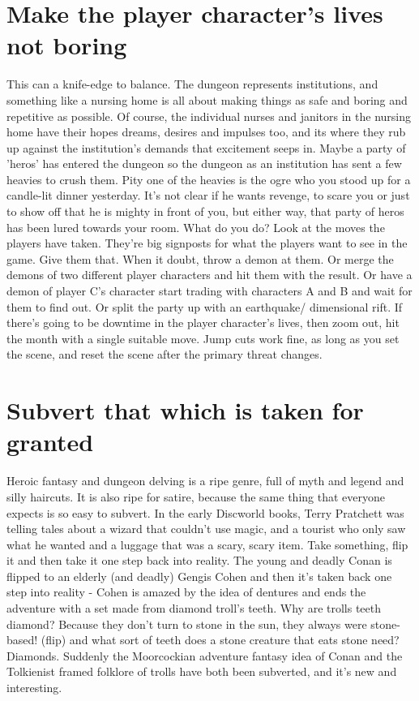 \documentclass{tufte-book}
\begin{document}
\section{Make the player character's lives not boring}
This can a knife-edge to balance. The dungeon represents institutions, and something like a nursing home is all about making things as safe and boring and repetitive as possible. Of course, the individual nurses and janitors in the nursing home have their hopes dreams, desires and impulses too, and its where they rub up against the institution's demands that excitement seeps in. Maybe a party of 'heros' has entered the dungeon so the dungeon as an institution has sent a few heavies to crush them. Pity one of the heavies is the ogre who you stood up for a candle-lit dinner yesterday. It's not clear if he wants revenge, to scare you or just to show off that he is mighty in front of you, but either way, that party of heros has been lured towards your room. What do you do?
 Look at the moves the players have taken. They're big signposts for what the players want to see in the game. Give them that. When it doubt, throw a demon at them. Or merge the demons of two different player characters and hit them with the result. Or have a demon of player C's character start trading with characters A and B and wait for them to find out. Or split the party up with an earthquake/ dimensional rift. If there's going to be downtime in the player character's lives, then zoom out, hit the month with a single suitable move. Jump cuts work fine, as long as you set the scene, and reset the scene after the primary threat changes.

\section{Subvert that which is taken for granted}
Heroic fantasy and dungeon delving is a ripe genre, full of myth and legend and silly haircuts. It is also ripe for satire, because the same thing that everyone expects is so easy to subvert. In the early Discworld books, Terry Pratchett was telling tales about a wizard that couldn't use magic, and a tourist who only saw what he wanted and a luggage that was a scary, scary item. Take something, flip it and then take it one step back into reality. The young and deadly Conan is flipped to an elderly (and deadly) Gengis Cohen and then it's taken back one step into reality - Cohen is amazed  by the idea of dentures and ends the adventure with a set made from diamond troll's teeth. Why are trolls teeth diamond? Because they don't turn to stone in the sun, they always were stone-based! (flip) and what sort of teeth does a stone creature that eats stone need? Diamonds.
Suddenly the Moorcockian adventure fantasy idea of Conan and the Tolkienist framed folklore of trolls have both been subverted, and it's new and interesting.
\end{document}
